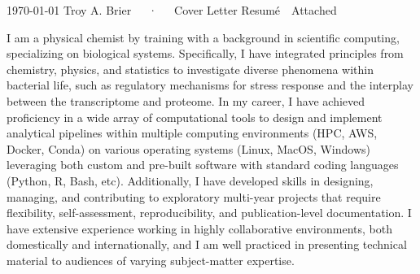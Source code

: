 \documentclass[11pt, a4paper]{awesome-cv}
\begin{document}
	
	\makecvheader[R]
	
	
	\makecvfooter
	{\today}
	{Troy A. Brier~~~·~~~Cover Letter}
	{Resum\'{e}~~Attached}
	
	\makelettertitle
	\begin{cvletter}
		I am a physical chemist by training with a background in scientific computing, specializing on biological systems.
		Specifically, I have integrated principles from chemistry, physics, and statistics to investigate diverse phenomena within bacterial life, such as regulatory mechanisms for stress response and the interplay between the transcriptome and proteome.	
		In my career, I have achieved proficiency in a wide array of computational tools to design and implement analytical pipelines within multiple computing environments (HPC, AWS, Docker, Conda) on various operating systems (Linux, MacOS, Windows) leveraging both custom and pre-built software with standard coding languages (Python, R, Bash, etc).
		Additionally, I have developed skills in designing, managing, and contributing to exploratory multi-year projects that require flexibility, self-assessment, reproducibility, and publication-level documentation.
		I have extensive experience working in highly collaborative environments, both domestically and internationally, and I am well practiced in presenting technical material to audiences of varying subject-matter expertise.
		

\end{cvletter}
\end{document}
